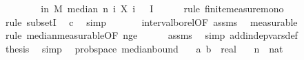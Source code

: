 \begin{isabellebody}
\ \ \isamarkupfalse%
\ \isamarkupfalse%
\ {\isachardoublequoteopen}{\isachardot}{\kern0pt}{\isachardot}{\kern0pt}{\isachardot}{\kern0pt}\ {\isasymle}\ {\isasymP}{\isacharparenleft}{\kern0pt}{\isasymomega}\ in\ M{\isachardot}{\kern0pt}\ median\ n\ {\isacharparenleft}{\kern0pt}{\isasymlambda}i{\isachardot}{\kern0pt}\ X\ i\ {\isasymomega}{\isacharparenright}{\kern0pt}\ {\isasymin}\ I{\isacharparenright}{\kern0pt}{\isachardoublequoteclose}\isanewline
\ \ \ \ \isamarkupfalse%
\ {\isacharparenleft}{\kern0pt}rule\ finite{\isacharunderscore}{\kern0pt}measure{\isacharunderscore}{\kern0pt}mono{\isacharparenright}{\kern0pt}\isanewline
\ \ \ \ \ \isamarkupfalse%
\ {\isacharparenleft}{\kern0pt}rule\ subsetI{\isacharparenright}{\kern0pt}\ \isamarkupfalse%
\ c\ \isamarkupfalse%
\ simp\ \isanewline
\ \ \ \ \isamarkupfalse%
\ interval{\isacharunderscore}{\kern0pt}borel{\isacharbrackleft}{\kern0pt}OF\ assms{\isacharparenleft}{\kern0pt}{}{\isacharparenright}{\kern0pt}{\isacharbrackright}{\kern0pt}\ \isamarkupfalse%
\ measurable\isanewline
\ \ \ \ \isamarkupfalse%
\ {\isacharparenleft}{\kern0pt}rule\ median{\isacharunderscore}{\kern0pt}measurable{\isacharbrackleft}{\kern0pt}OF\ n{\isacharunderscore}{\kern0pt}ge{\isacharunderscore}{\kern0pt}{}{\isacharbrackright}{\kern0pt}{\isacharparenright}{\kern0pt}\isanewline
\ \ \ \ \isamarkupfalse%
\ assms{\isacharparenleft}{\kern0pt}{}{\isacharparenright}{\kern0pt}\ \isamarkupfalse%
\ {\isacharparenleft}{\kern0pt}simp\ add{\isacharcolon}{\kern0pt}indep{\isacharunderscore}{\kern0pt}vars{\isacharunderscore}{\kern0pt}def{\isacharparenright}{\kern0pt}\isanewline
\ \ \isamarkupfalse%
\ \isamarkupfalse%
\ {\isacharquery}{\kern0pt}thesis\ \isamarkupfalse%
\ simp\isanewline
{}\isamarkupfalse%
%
\endisatagproof
{\isafoldproof}%
%
\isadelimproof
\isanewline
%
\endisadelimproof
\isanewline
{}\isamarkupfalse%
\ {\isacharparenleft}{\kern0pt}\ prob{\isacharunderscore}{\kern0pt}space{\isacharparenright}{\kern0pt}\ median{\isacharunderscore}{\kern0pt}bound{\isacharunderscore}{\kern0pt}{}{\isacharcolon}{\kern0pt}\isanewline
\ \ \ a\ b\ {\isacharcolon}{\kern0pt}{\isacharcolon}{\kern0pt}\ real\isanewline
\ \ \ n\ {\isacharcolon}{\kern0pt}{\isacharcolon}{\kern0pt}\ nat\isanewline
\ \ \ {\isachardoublequoteopen}{\isasymalpha}\ {\isachargreater}{\kern0pt}\ {}{\isachardoublequoteclose}\isanewline

\end{isabellebody}
